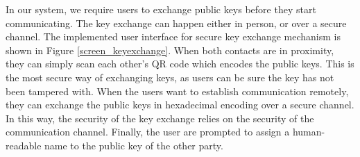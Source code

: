 In our system, we require users to exchange public keys before they start communicating. The key exchange can happen either in person, or over a secure channel. The implemented user interface for secure key exchange mechanism is shown in Figure \ref{screen_keyexchange}. When both contacts are in proximity, they can simply scan each other's QR code which encodes the public keys. This is the most secure way of exchanging keys, as users can be sure the key has not been tampered with. When the users want to establish communication remotely, they can exchange the public keys in hexadecimal encoding over a secure channel. In this way, the security of the key exchange relies on the security of the communication channel. Finally, the user are prompted to assign a human-readable name to the public key of the other party.


